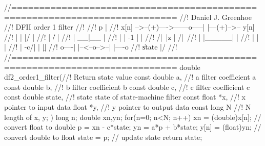 //===========================================================================
//! Daniel J. Greenhoe
//! \brief DFII order 1 filter
//! 
//!                           p     |\a
//!   x[n] -->--(+)---->------o-----| |---(+)-->-- y[n]
//!              |            |     |/     |
//!              |           \|/           |
//!              |          __|__          |
//!              |         | -1  |         |
//!             /|\        |z    |        /|\
//!              |         |_____|         |
//!              |            |            |
//!              |   -c/|     |     |\b    |
//!              o----| |--<--o-->--| |----o
//!                    \|   state   |/
//! \endcode
//===========================================================================
double df2_order1_filter(//! \return     Return state value
  const double a,        //! \param[in]  a      filter coefficient a
  const double b,        //! \param[in]  b      filter coefficient b
  const double c,        //! \param[in]  c      filter coefficient c
  const double state,    //! \param[in]  state  state of state-machine filter
  const float *x,        //! \param[in]  x      pointer to input  data
        float *y,        //! \param[out] y      pointer to output data
  const long   N         //! \param[in]  N      length of x, y;
  )
{
  long n;
  double xn,yn;
  for(n=0; n<N; n++)
  {
    xn    = (double)x[n];    // convert float to double
    p     = xn  - c*state;
    yn    = a*p + b*state;
    y[n]  = (float)yn;       // convert double to float
    state = p;               // update state
  }
  return state;
}
